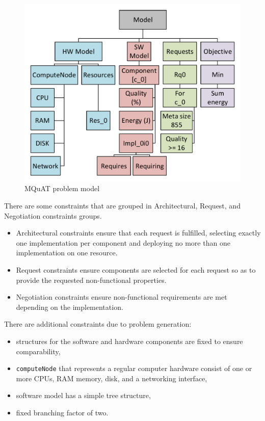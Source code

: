 \begin{figure}
	\centering
	\includegraphics[width=\textwidth]{images/MQuATModel}
	\caption[MQuAT problem model]{MQuAT problem model}
	\label{fig:mquatmodel}
\end{figure}



There are some constraints that are grouped in Architectural, Request, and Negotiation constraints groups.

\begin{itemize}
	\item Architectural constraints ensure that each request is fulfilled, selecting exactly one implementation per component and deploying no more than one implementation on one resource.
	\item Request constraints ensure components are selected for each request so as to provide the requested non-functional properties.
	\item Negotiation constraints ensure non-functional requirements are met depending on the implementation.
\end{itemize}

There are additional constraints due to problem generation:

\begin{itemize}
	\item structures for the software and hardware components are fixed to ensure comparability,
	\item \texttt{computeNode} that represents a regular computer hardware consist of one or more CPUs, RAM memory, disk, and a networking interface,
	\item software model has a simple tree structure,
	\item fixed branching factor of two.
\end{itemize}

